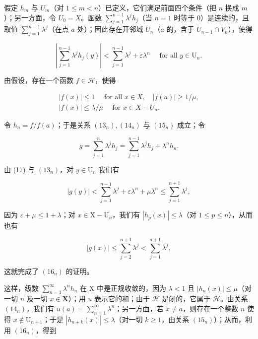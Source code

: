 假定 \(h_m\) 与 \(U_m\)（对 \(1 \leqslant m < n\)）已定义，它们满足前面四个条件（把 \(n\) 换成 \(m\)）；另一方面，令 \(U_0 = X\)。函数 \(\sum_{j=1}^{n-1} \lambda^j h_j\)（当 \(n = 1\) 时等于 0）是连续的，且取值 \(\sum_{j=1}^{n-1} \lambda^j\)（在点 \(a\) 处）；因此存在开邻域 \(U_n\)（\(a\) 的，含于 \(U_{n-1} \cap V_n\)），使得

\[
\left| \sum_ {j = 1} ^ {n - 1} \lambda^ {j} h _ {j} (y) \right| <   \sum_ {j = 1} ^ {n - 1} \lambda^ {j} + \varepsilon \lambda^ {n} \quad \text { for   all } y \in \mathrm{U} _ {n}.\tag{17}
\]

由假设，存在一个函数 \(f \in \mathcal{H}\)，使得

\[
\begin{array}{l} | f (x) | \leqslant 1 \quad \text { for   all } x \in X, \quad | f (a) | \geqslant 1 / \mu , \\ | f (x) | \leqslant \lambda / \mu \quad \text { for } x \in X - U _ {n}. \end{array}
\]

令 \(h_n = f / f(a)\)；于是关系 \((13_n), (14_n)\) 与 \((15_n)\) 成立；令

\[
g = \sum_ {j = 1} ^ {n} \lambda^ {j} h _ {j} = \sum_ {j = 1} ^ {n - 1} \lambda^ {j} h _ {j} + \lambda^ {n} h _ {n}.
\]

由 (17) 与 \((13_{n})\)，对 \(y \in \mathrm{U}_n\) 我们有

\[
| g (y) | <   \sum_ {j = 1} ^ {n - 1} \lambda^ {j} + \varepsilon \lambda^ {n} + \mu \lambda^ {n} \leqslant \sum_ {j = 1} ^ {n + 1} \lambda^ {j},
\]

因为 \(\varepsilon + \mu \leqslant 1 + \lambda\)；对 \(x \in \mathrm{X} - \mathrm{U}_n\)，我们有 \(|h_p(x)| \leqslant \lambda\)（对 \(1 \leqslant p \leqslant n\)），从而也有

\[
| g (x) | \leqslant \sum_ {j = 2} ^ {n + 1} \lambda^ {j} <   \sum_ {j = 1} ^ {n + 1} \lambda^ {j},
\]

这就完成了 \((16_{n})\) 的证明。

这样，级数 \(\sum_{n=1}^{\infty} \lambda^n h_n\) 在 X 中是正规收敛的，因为 \(\lambda < 1\) 且 \(|h_n(x)| \leqslant \mu\)（对一切 \(n\) 及一切 \(x \in \mathbf{X}\)）；用 \(u\) 表示它的和；由于 \(\mathcal{H}\) 是闭的，它属于 \(\mathcal{H}\)。由关系 \((14_n)\)，我们有 \(u(a) = \sum_{n=1}^{\infty} \lambda^n\)；另一方面，若 \(x \neq a\)，则存在一个整数 \(n\) 使得 \(x \notin \mathrm{U}_{n+1}\)；于是 \(|h_{n+k}(x)| \leqslant \lambda\)（对一切 \(k \geqslant 1\)，由关系 \((15_n)\)）；从而，利用 \((16_n)\)，得到

